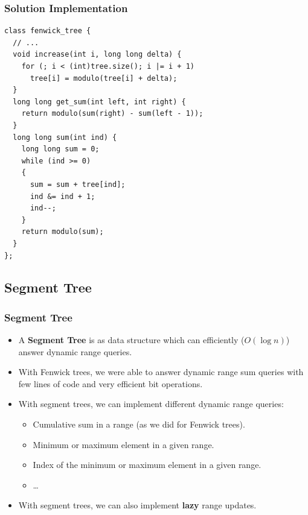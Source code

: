 \documentclass{beamer}
\begin{document}
\begin{frame}[containsverbatim]
\frametitle{Solution Implementation}

\scriptsize

\begin{lstlisting}[mathescape]
class fenwick_tree {
  // ...
  void increase(int i, long long delta) {
    for (; i < (int)tree.size(); i |= i + 1)
      tree[i] = modulo(tree[i] + delta);
  }
  long long get_sum(int left, int right) {
    return modulo(sum(right) - sum(left - 1));
  }
  long long sum(int ind) {
    long long sum = 0;
    while (ind >= 0)
    {
      sum = sum + tree[ind];
      ind &= ind + 1;
      ind--;
    }
    return modulo(sum);
  }
};
\end{lstlisting}

\end{frame}

\fi


\subsection{Segment Tree}

\begin{frame}%
\frametitle{Segment Tree}

\begin{itemize}

\item A \textbf{Segment Tree} is as data structure which can efficiently ($O(\log n)$) answer dynamic range queries.

\vspace{0.2cm}

\item<2-> With Fenwick trees, we were able to answer dynamic range sum queries with few lines of code and very efficient bit operations.

\vspace{0.2cm}

\item<3-> With segment trees, we can implement different dynamic range queries:
\begin{itemize}
\item<3-> Cumulative sum in a range (as we did for Fenwick trees).

\item<3-> Minimum or maximum element in a given range.

\item<3-> Index of the minimum or maximum element in a given range.

\item<3-> \ldots

\end{itemize}

\vspace{0.2cm}

\item<4-> With segment trees, we can also implement \textbf{lazy} range updates.

\end{itemize}

\end{frame}
\end{document}
